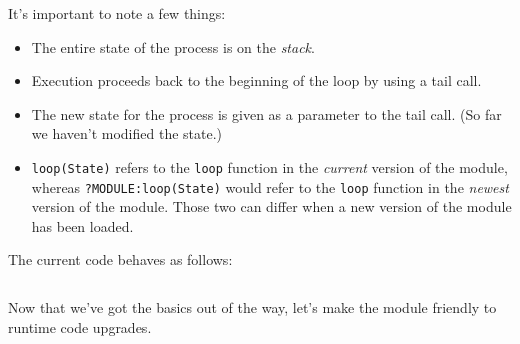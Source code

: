 \documentclass{beamer}
\begin{document}
\begin{frame}[fragile]
  It’s important to note a few things:

  \begin{itemize}
    \item The entire state of the process is on the \emph{stack}.

    \item Execution proceeds back to the beginning of the loop by using a tail
    call.

    \item The new state for the process is given as a parameter to the tail
    call.  (So far we haven’t modified the state.)

    \item \verb|loop(State)| refers to the \verb|loop| function in the
    \emph{current} version of the module, whereas \verb|?MODULE:loop(State)|
    would refer to the \verb|loop| function in the \emph{newest} version of the
    module. Those two can differ when a new version of the module has been
    loaded.
  \end{itemize}
\end{frame}

\begin{frame}[fragile]
  The current code behaves as follows:

  \inputminted{erlang}{pingpong-00-example.erl-sh}
\end{frame}

\begin{frame}[fragile]
  Now that we’ve got the basics out of the way, let’s make the module friendly
  to runtime code upgrades.
\end{frame}
\end{document}
